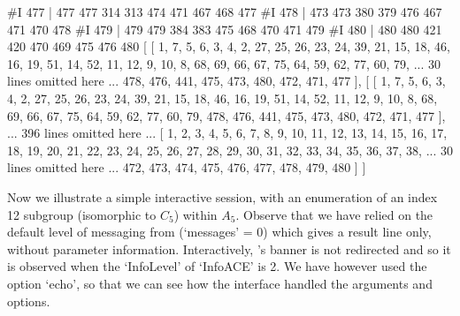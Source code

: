 #I     477 |    477    477    314    313    474    471    467    468    477
#I     478 |    473    473    380    379    476    467    471    470    478
#I     479 |    479    479    384    383    475    468    470    471    479
#I     480 |    480    480    421    420    470    469    475    476    480
[ [ 1, 7, 5, 6, 3, 4, 2, 27, 25, 26, 23, 24, 39, 21, 15, 18, 46, 16, 19, 51, 
      14, 52, 11, 12, 9, 10, 8, 68, 69, 66, 67, 75, 64, 59, 62, 77, 60, 79, 
... 30 lines omitted here ...
      478, 476, 441, 475, 473, 480, 472, 471, 477 ],
[ [ 1, 7, 5, 6, 3, 4, 2, 27, 25, 26, 23, 24, 39, 21, 15, 18, 46, 16, 19, 51, 
      14, 52, 11, 12, 9, 10, 8, 68, 69, 66, 67, 75, 64, 59, 62, 77, 60, 79, 
      478, 476, 441, 475, 473, 480, 472, 471, 477 ], 
... 396 lines omitted here ...
  [ 1, 2, 3, 4, 5, 6, 7, 8, 9, 10, 11, 12, 13, 14, 15, 16, 17, 18, 19, 20, 
      21, 22, 23, 24, 25, 26, 27, 28, 29, 30, 31, 32, 33, 34, 35, 36, 37, 38, 
... 30 lines omitted here ...
      472, 473, 474, 475, 476, 477, 478, 479, 480 ] ]
\endtt


Now we illustrate a simple interactive session, with an enumeration of
an index 12 subgroup (isomorphic to $C_5$) within $A_5$. Observe  that
we  have  relied  on  the  default  level  of  messaging  from  {\ACE}
(`messages' = 0) which gives a result  line  only,  without  parameter
information. Interactively, {\ACE}'s banner is not redirected  and  so
it is observed when the `InfoLevel' of `InfoACE' is 2. We have however
used the option `echo', so that we can see how the  interface  handled
the arguments and options.

